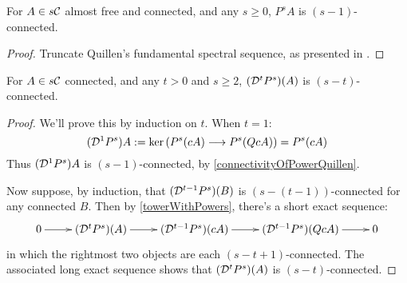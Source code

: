 \documentclass[10pt]{article}
\newcommand{\caldup}[1]{\calD^{\smash{#1}}}
\newcommand{\Comm}{\calC}
\begin{document}
\begin{convergence}
\begin{prop}\label{connectivityOfPowerQuillen}
For $A\in s\Comm$ almost free and connected, and any $s\geq0$, $P^{s}A$ is $(s-1)$-connected.
\end{prop}
\begin{proof}
Truncate Quillen's fundamental spectral sequence, as presented in \cite[thm 6.2]{MR1089001}.
\end{proof}
\begin{cor}\label{connectivityOfDerivedPowers}
For $A\in s\Comm$ connected, and any $t>0$ and $s\geq2$, $(\caldup{t}P^{s})(A)$ is $(s-t)$-connected.
\end{cor}
\begin{proof}
We'll prove this by induction on $t$. When $t=1$:
\[(\caldup{1}P^{s})A:=\ker(P^{s}(cA)\to P^{s}(QcA))=P^{s}(cA)\]
Thus $(\caldup{1}P^{s})A$ is $(s-1)$-connected, by \ref{connectivityOfPowerQuillen}.

Now suppose, by induction, that $(\caldup{t-1}P^{s})(B)$ is $(s-(t-1))$-connected for any connected $B$. Then by \ref{towerWithPowers}, there's a short exact sequence:
\[\xymatrix{
0\ar[r]&
(\caldup{t}P^{s})(A)\ar[r]&
(\caldup{t-1}P^{s})(cA)\ar[r]&
(\caldup{t-1}P^{s})(QcA)\ar[r]&
0
}\]
in which the rightmost two objects are each $(s-t+1)$-connected. The associated long exact sequence shows that $(\caldup{t}P^{s})(A)$ is $(s-t)$-connected.
\end{proof}


\end{convergence}
\end{document}
